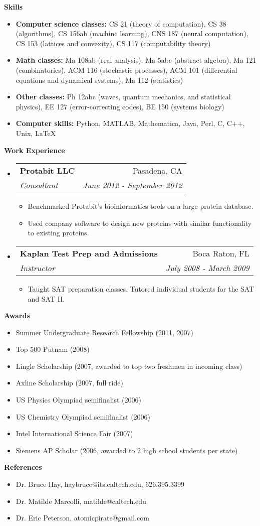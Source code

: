 \documentclass[letterpaper,11pt]{article}
\makeatletter
\newcommand{\resitem}[1]{\item #1 \vspace{-2pt}}
\newcommand{\resheading}[1]{{\large \colorbox{mygrey}{\begin{minipage}{\textwidth}{\textbf{#1 \vphantom{p\^{E}}}}\end{minipage}}}}
\newcommand{\ressubheading}[4]{
\begin{tabular*}{7.0in}{l@{\extracolsep{\fill}}r}
		\textbf{#1} & #2 \\
		\textit{#3} & \textit{#4} \\
\end{tabular*}\vspace{-6pt}}
\makeatother
\begin{document}
\resheading{Skills}
\begin{itemize}
\item \textbf{Computer science classes:} CS 21 (theory of computation), CS 38 (algorithms), CS 156ab (machine learning), CNS 187 (neural computation), CS 153 (lattices and convexity), CS 117 (computability theory)
\item \textbf{Math classes:}  Ma 108ab (real analysis), Ma 5abc (abstract algebra), Ma 121 (combinatorics), ACM 116 (stochastic processes), ACM 101 (differential equations and dynamical systems), Ma 112 (statistics)
\item \textbf{Other classes:} Ph 12abc (waves, quantum mechanics, and statistical physics), EE 127 (error-correcting codes), BE 150 (systems biology)
\item \textbf{Computer skills:} Python, MATLAB, Mathematica, Java, Perl, C, C++, Unix, LaTeX
\end{itemize}

\resheading{Work Experience}
\begin{itemize}
\item
	\ressubheading{Protabit LLC}{Pasadena, CA}{Consultant}{June 2012 - September 2012}
	\begin{itemize}
		\resitem{Benchmarked Protabit's bioinformatics tools on a large protein database.}
		\resitem{Used company software to design new proteins with similar functionality to existing proteins.}
	\end{itemize}
\item
	\ressubheading{Kaplan Test Prep and Admissions}{Boca Raton, FL}{Instructor}{July 2008 - March 2009}
	\begin{itemize}
		\resitem{Taught SAT preparation classes.  Tutored individual students for the SAT and SAT II.}
	\end{itemize}
\end{itemize}

\resheading{Awards}
\begin{itemize}
    \item Summer Undergraduate Research Fellowship (2011, 2007)
	\item Top 500 Putnam (2008)
	\item Lingle Scholarship (2007, awarded to top two freshmen in incoming class)
	\item Axline Scholarship (2007, full ride)
	\item US Physics Olympiad semifinalist (2006)
	\item US Chemistry Olympiad semifinalist (2006)
	\item Intel International Science Fair (2007)
	\item Siemens AP Scholar (2006, awarded to 2 high school students per state)
\end{itemize}

\resheading{References}
\begin{itemize}
\item Dr. Bruce Hay, haybruce@its.caltech.edu, 626.395.3399
\item Dr. Matilde Marcolli, matilde@caltech.edu
\item Dr. Eric Peterson, atomicpirate@gmail.com
\end{itemize}
\end{document}
